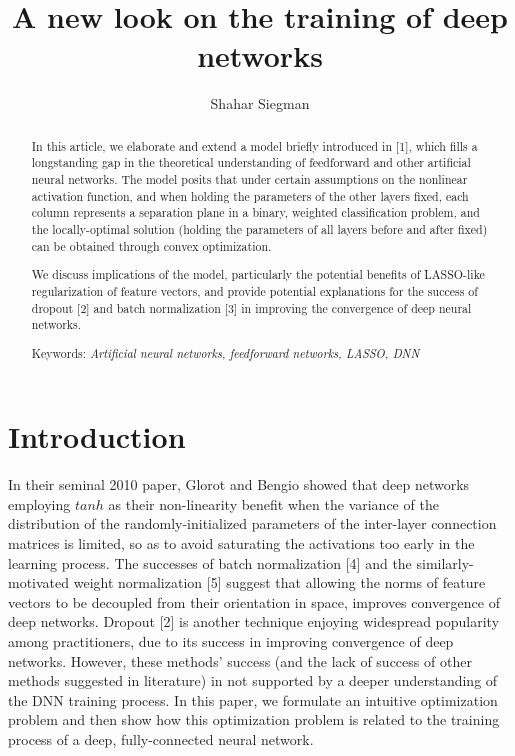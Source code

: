 \documentclass[]{article}
\title{A new look on the training of deep networks}
\author{Shahar Siegman}
\begin{document}
 	
 	\maketitle
 	
 	\begin{abstract}
 		In this article, we elaborate and extend a model briefly introduced in [1], which fills a longstanding gap in the theoretical understanding of feedforward and other artificial neural networks. The model posits that under certain assumptions on the nonlinear activation function, and when holding the parameters of the other layers fixed, each column represents a separation plane in a binary, weighted classification problem, and the locally-optimal solution (holding the parameters of all layers before and after fixed) can be obtained through convex optimization. 
 		
 		We discuss implications of the model, particularly the potential benefits of LASSO-like regularization of feature vectors, and provide potential explanations for the success of dropout [2] and batch normalization [3] in improving the convergence of deep neural networks.
 		
 		Keywords: \textit{Artificial neural networks, feedforward networks, LASSO, DNN}
 	\end{abstract}
 	
 	\section{Introduction}
 		In their seminal 2010 paper, Glorot and Bengio showed that deep networks employing $tanh$ as their non-linearity benefit when the variance of the distribution of the randomly-initialized parameters of the inter-layer connection matrices is limited, so as to avoid saturating the activations too early in the learning process. The successes of batch normalization [4] and the similarly-motivated weight normalization [5] suggest that allowing the norms of feature vectors to be decoupled from their orientation in space, improves convergence of deep networks. Dropout [2] is another technique enjoying widespread popularity among practitioners, due to its success in improving convergence of deep networks. However, these methods' success (and the lack of success of other methods suggested in literature) in not supported by a deeper understanding of the DNN training process. 
 		In this paper, we formulate an intuitive optimization problem and then show how this optimization problem is related to the training process of a deep, fully-connected neural network.
 		 
\end{document}
